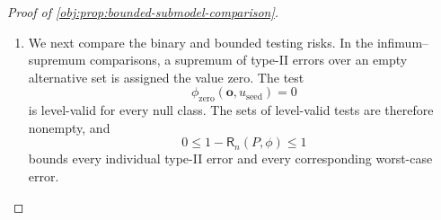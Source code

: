\begin{proof}[Proof of \cref{obj:prop:bounded-submodel-comparison}]
\begin{enumerate}
Now let \(n\in\mathbb N\), let \(\phi\) be a measurable \([0,1]\)-valued test, and write its input as
\[
\boldsymbol o=(o_i)_{i=1}^n\in\mathcal O^n,\qquad
o_i=(x_i,a_{\mathrm{obs},i},y_i),\qquad
u_{\mathrm{seed}}\in[0,1].
\]
Define its integrated rejection map by
\[
\widetilde\phi(\boldsymbol o,u_{\mathrm{seed}})
=
\sum_{\boldsymbol b_{\mathrm{sign}}\in\{-1,1\}^n}
\phi\!\left(
 ((x_i,a_{\mathrm{obs},i},b_{\mathrm{sign},i}))_{i=1}^n,
 u_{\mathrm{seed}}
\right)
\prod_{i=1}^n
\frac{1+b_{\mathrm{sign},i}\ell_1(y_i)}2,
\qquad
\boldsymbol b_{\mathrm{sign}}
=(b_{\mathrm{sign},i})_{i=1}^n.
\]
Its weights are nonnegative and satisfy
\[
\sum_{\boldsymbol b_{\mathrm{sign}}\in\{-1,1\}^n}
\prod_{i=1}^n
\frac{1+b_{\mathrm{sign},i}\ell_1(y_i)}2
=
\prod_{i=1}^n
\left(
\frac{1+\ell_1(y_i)}2+\frac{1-\ell_1(y_i)}2
\right)=1.
\]
Thus \(\widetilde\phi\) is measurable and takes values in \([0,1]\). For \(n=0\), the sign-vector set contains the single empty vector and the empty product is one, so the same definition applies.

The finite sum is the integral of \(\phi\) against the independent product of the record kernels. Independence and the one-record identity imply
\[
\int_{\mathcal O^n}
\bigotimes_{i=1}^n\mathsf K_{\mathrm{sign}}(o_i,\cdot)\,
P^{\otimes n}(d\boldsymbol o)
=
\mathcal C_{\mathrm{bin}}(P)^{\otimes n}.
\]
This follows by factorization on measurable rectangles; the empty product gives the identity for \(n=0\). Hence, for every fixed \(u_{\mathrm{seed}}\),
\[
\int_{\mathcal O^n}
\widetilde\phi(\boldsymbol o,u_{\mathrm{seed}})
\,P^{\otimes n}(d\boldsymbol o)
=
\int_{\mathcal O^n}
\phi(\boldsymbol o,u_{\mathrm{seed}})
\,\mathcal C_{\mathrm{bin}}(P)^{\otimes n}(d\boldsymbol o).
\]
Integrating in the public seed and using the experiment of
\cref{obj:def:original-record-experiment} gives
\[
\mathsf R_n(P,\widetilde\phi)
=
\mathsf R_n(\mathcal C_{\mathrm{bin}}(P),\phi).
\]
Boundedness of the tests justifies the integral exchanges. On bounded records, the kernel uses exactly the probabilities \((1+Y)/2\) and \((1-Y)/2\) stated in the proposition.

\item We next compare the binary and bounded testing risks. In the infimum--supremum comparisons, a supremum of type-II errors over an empty alternative set is assigned the value zero. The test
\[
\phi_{\mathrm{zero}}(\boldsymbol o,u_{\mathrm{seed}})=0
\]
is level-valid for every null class. The sets of level-valid tests are therefore nonempty, and
\[
0\le 1-\mathsf R_n(P,\phi)\le1
\]
bounds every individual type-II error and every corresponding worst-case error.


\end{enumerate}
\end{proof}

